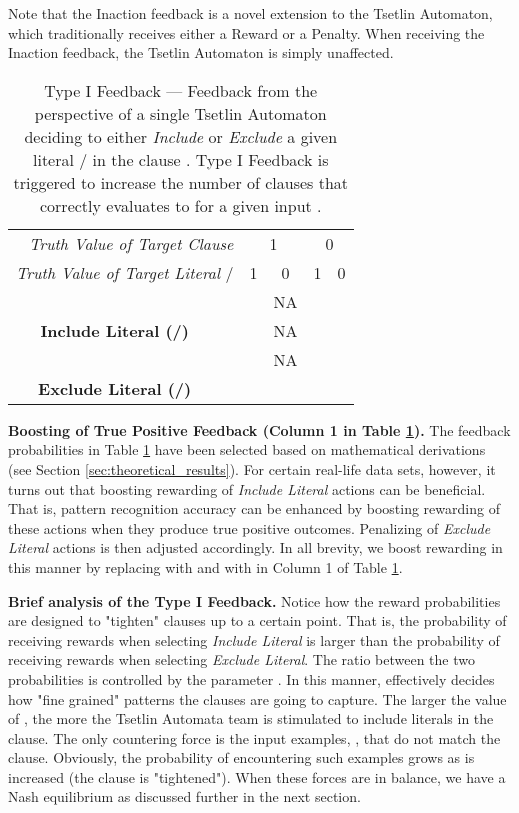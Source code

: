 \documentclass[11pt,a4paper]{article}
\newcommand{\True}{\mbox{1}}
\newcommand{\False}{\mbox{0}}
\begin{document}
Note that the Inaction feedback is a novel extension to the Tsetlin Automaton, which traditionally receives either a Reward or a Penalty. When receiving the Inaction feedback, the Tsetlin Automaton is simply unaffected.

\begin{table}[bh!]
\centering
\begin{tabular}{c|ccccc}
\multicolumn{2}{r|}{{\it Truth Value of Target Clause}  }&\multicolumn{2}{c}{\True}&\multicolumn{2}{c}{\False}\\  
\multicolumn{2}{r|}{{\it Truth Value of Target Literal} /}&{\True}&{\False}&{\True}&{\False}\\
 \hline
 \hline
    \multirow{3}{*}{\bf Include Literal (/)}&\multicolumn{1}{c|}{}&&NA&&\\
    &\multicolumn{1}{c|}{}&&NA&&\\
  &\multicolumn{1}{c|}{}&&NA&&\\
  \hline
  \multirow{3}{*}{\bf Exclude Literal (/)}&\multicolumn{1}{c|}{}&&& &\\
  &\multicolumn{1}{c|}{}&&& &\\
  &\multicolumn{1}{c|}{}&&&&\\
  \hline
\end{tabular}
\caption{Type I Feedback --- Feedback from the perspective of a single Tsetlin Automaton deciding to either \emph{Include} or \emph{Exclude} a given literal / in the clause . Type I Feedback is triggered to increase the number of clauses that correctly evaluates to  for a given input .}
\label{table:type_i_feedback}
\end{table}

{\bf Boosting of True Positive Feedback (Column 1 in Table \ref{table:type_i_feedback}).} The feedback probabilities in Table \ref{table:type_i_feedback} have been selected based on mathematical derivations (see Section \ref{sec:theoretical_results}). For certain real-life data sets, however, it turns out that boosting rewarding of \emph{Include Literal} actions can be beneficial. That is, pattern recognition accuracy can be enhanced by boosting rewarding of these actions when they produce true positive outcomes. Penalizing of \emph{Exclude Literal} actions is then adjusted accordingly.  In all brevity, we boost rewarding in this manner by replacing  with  and  with  in Column 1 of Table \ref{table:type_i_feedback}.

{\bf Brief analysis of the Type I Feedback.} Notice how the reward probabilities are designed to "tighten" clauses up to a certain point. That is, the probability of receiving rewards when selecting \emph{Include Literal} is larger than the probability of receiving rewards when selecting \emph{Exclude Literal}. The ratio between the two probabilities is controlled by the parameter . In this manner,  effectively decides how "fine grained" patterns the clauses are going to capture. The larger the value of , the more the Tsetlin Automata team is stimulated to include literals in the clause. The only countering force is the input examples, , that do not match the clause. Obviously, the probability of encountering such examples grows as  is increased (the clause is "tightened"). When these forces are in balance, we have a Nash equilibrium as discussed further in the next section. 
\end{document}
